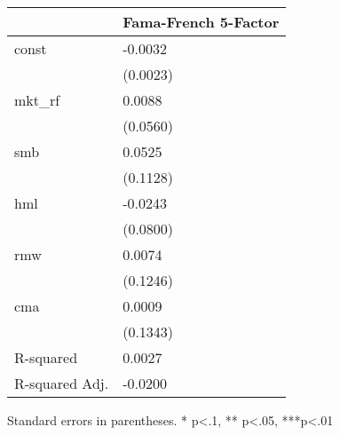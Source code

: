 \begin{table}
\caption{}
\label{}
\begin{center}
\begin{tabular}{ll}
\hline
               & Fama-French 5-Factor  \\
\hline
const          & -0.0032               \\
               & (0.0023)              \\
mkt\_rf        & 0.0088                \\
               & (0.0560)              \\
smb            & 0.0525                \\
               & (0.1128)              \\
hml            & -0.0243               \\
               & (0.0800)              \\
rmw            & 0.0074                \\
               & (0.1246)              \\
cma            & 0.0009                \\
               & (0.1343)              \\
R-squared      & 0.0027                \\
R-squared Adj. & -0.0200               \\
\hline
\end{tabular}
\end{center}
\end{table}
\bigskip
Standard errors in parentheses. \newline 
* p<.1, ** p<.05, ***p<.01